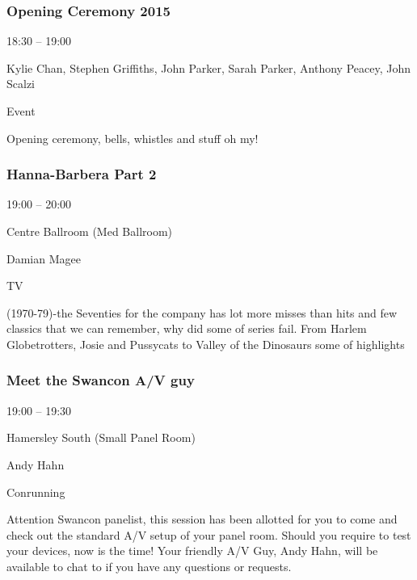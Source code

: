 \documentclass{scrreprt}
\begin{document}
\begin{multicols}{2}
\subsubsection*{Opening Ceremony 2015}\begin{description}
\setlength{\itemsep}{0pt}
\setlength{\parsep}{0pt}
\setlength{\parskip}{0pt}
\item[Time:]{18:30 -- 19:00}
\item[People:]{Kylie Chan, Stephen Griffiths, John Parker, Sarah Parker, Anthony Peacey, John Scalzi}
\item[Tags:]{Event}\end{description}
Opening ceremony, bells, whistles and stuff oh my!
\subsubsection*{Hanna-Barbera Part 2}\begin{description}
\setlength{\itemsep}{0pt}
\setlength{\parsep}{0pt}
\setlength{\parskip}{0pt}
\item[Time:]{19:00 -- 20:00}
\item[Venue:]{Centre Ballroom (Med Ballroom)}
\item[People:]{Damian Magee}
\item[Tags:]{TV}\end{description}
(1970-79)-the Seventies for the company has lot more misses than hits and few classics that we can remember, why did some of series fail.  From Harlem Globetrotters, Josie and Pussycats to Valley of the Dinosaurs some of highlights
\subsubsection*{Meet the Swancon A/V guy}\begin{description}
\setlength{\itemsep}{0pt}
\setlength{\parsep}{0pt}
\setlength{\parskip}{0pt}
\item[Time:]{19:00 -- 19:30}
\item[Venue:]{Hamersley South (Small Panel Room)}
\item[People:]{Andy Hahn}
\item[Tags:]{Conrunning}\end{description}
Attention Swancon panelist, this session has been allotted for you to come and check out the standard A/V setup of your panel room. Should you require to test your devices, now is the time! Your friendly A/V Guy, Andy Hahn, will be available to chat to if you have any questions or requests.

\end{multicols}
\end{document}
